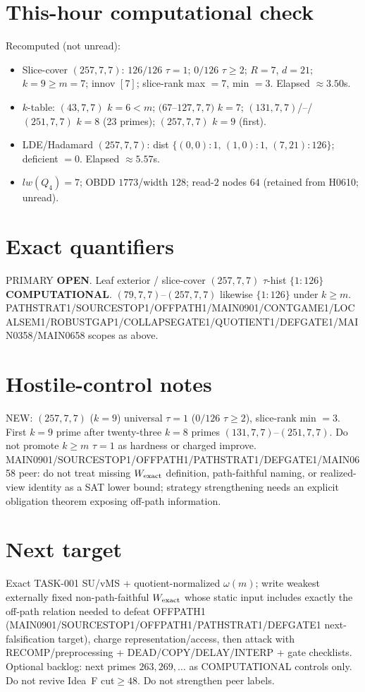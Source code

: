 \documentclass[11pt]{article}
\begin{document}
\section*{This-hour computational check}
Recomputed (not unread):
\begin{itemize}
\item Slice-cover $(257,7,7)$: $126/126$ $\tau{=}1$; $0/126$ $\tau{\ge}2$; $R{=}7$, $d{=}21$;
  $k{=}9{\ge}m{=}7$; innov $[7]$; slice-rank max $=7$, min $=3$. Elapsed $\approx3.50$s.
\item $k$-table: $(43,7,7)$ $k{=}6{<}m$; $(67$--$127,7,7)$ $k{=}7$;
  $(131,7,7)$/--/$(251,7,7)$ $k{=}8$ (23 primes); $(257,7,7)$ $k{=}9$ (first).
\item LDE/Hadamard $(257,7,7)$: dist $\{(0,0){:}1,\,(1,0){:}1,\,(7,21){:}126\}$; deficient $=0$. Elapsed $\approx5.57$s.
\item $lw(Q_4)=7$; OBDD $1773$/width $128$; read-$2$ nodes $64$ (retained from H0610; unread).
\end{itemize}

\section*{Exact quantifiers}
PRIMARY \textbf{OPEN}. Leaf exterior / slice-cover $(257,7,7)$ $\tau$-hist $\{1{:}126\}$ \textbf{COMPUTATIONAL}.
$(79,7,7)$--$(257,7,7)$ likewise $\{1{:}126\}$ under $k{\ge}m$.
PATHSTRAT1/SOURCESTOP1/OFFPATH1/MAIN0901/CONTGAME1/LOCALSEM1/ROBUSTGAP1/COLLAPSEGATE1/QUOTIENT1/DEFGATE1/MAIN0358/MAIN0658 scopes as above.

\section*{Hostile-control notes}
NEW: $(257,7,7)$ ($k{=}9$) universal $\tau{=}1$ ($0/126$ $\tau{\ge}2$), slice-rank min $=3$.
First $k{=}9$ prime after twenty-three $k{=}8$ primes $(131,7,7)$--$(251,7,7)$.
Do not promote $k{\ge}m$ $\tau{=}1$ as hardness or charged improve.
MAIN0901/SOURCESTOP1/OFFPATH1/PATHSTRAT1/DEFGATE1/MAIN0658 peer: do not treat missing $W_{\rm exact}$ definition,
path-faithful naming, or realized-view identity as a SAT lower bound;
strategy strengthening needs an explicit obligation theorem exposing off-path information.

\section*{Next target}
Exact TASK-001 SU/vMS + quotient-normalized $\omega(m)$; write weakest externally fixed non-path-faithful
$W_{\rm exact}$ whose static input includes exactly the off-path relation needed to defeat OFFPATH1
(MAIN0901/SOURCESTOP1/OFFPATH1/PATHSTRAT1/DEFGATE1 next-falsification target), charge representation/access,
then attack with RECOMP/preprocessing + DEAD/COPY/DELAY/INTERP + gate checklists.
Optional backlog: next primes $263,269,\ldots$ as COMPUTATIONAL controls only.
Do not revive Idea~F cut$\ge48$. Do not strengthen peer labels.
\end{document}
